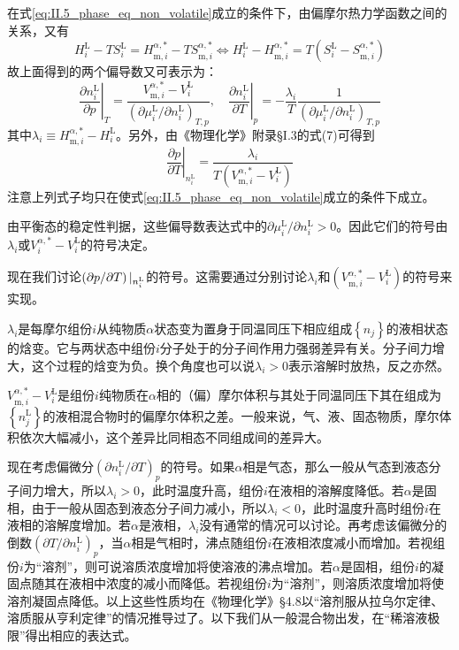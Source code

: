 \documentclass[main.tex]{subfiles}
\begin{document}
在式\eqref{eq:II.5_phase_eq_non_volatile}成立的条件下，由偏摩尔热力学函数之间的关系，又有
\[H_i^\text{L}-TS_i^\text{L}=H_{\text{m},i}^{\alpha,*}-TS_{\text{m},i}^{\alpha,*}\Leftrightarrow H_i^\text{L}-H_{\text{m},i}^{\alpha,*}=T\left(S_i^\text{L}-S_{\text{m},i}^{\alpha,*}\right)\]
故上面得到的两个偏导数又可表示为：
\[\left.\frac{\partial n_i^\text{L}}{\partial p}\right|_{T}=\frac{V_{\text{m},i}^{\alpha,*}-V_i^\text{L}}{\left(\partial \mu_i^\text{L}/\partial n_i^\text{L}\right)_{T,p}},\quad\left.\frac{\partial n_i^\text{L}}{\partial T}\right|_{p}=-\frac{\lambda_i}{T}\frac{1}{\left(\partial\mu_i^\text{L}/\partial n_i^\text{L}\right)_{T,p}}\]
其中$\lambda_i\equiv H_{\text{m},i}^{\alpha,*}-H_i^\text{L}$。另外，由《物理化学》附录\S I.3的式(7)可得到
\[\left.\frac{\partial p}{\partial T}\right|_{n_i^\text{L}}=\frac{\lambda_i}{T\left(V_{\text{m},i}^{\alpha,*}-V_i^\text{L}\right)}\]
注意上列式子均只在使式\eqref{eq:II.5_phase_eq_non_volatile}成立的条件下成立。

由平衡态的稳定性判据，这些偏导数表达式中的$\partial\mu_i^\text{L}/\partial n_i^\text{L}>0$。因此它们的符号由$\lambda_i$或$V_i^{\alpha,*}-V_i^\text{L}$的符号决定。

现在我们讨论$\left(\partial p\middle /\partial T\right)|_{n_i^\text{L}}$的符号。这需要通过分别讨论$\lambda_i$和$\left(V_{\text{m},i}^{\alpha,*}-V_i^\text{L}\right)$的符号来实现。

$\lambda_i$是每摩尔组份$i$从纯物质$\alpha$状态变为置身于同温同压下相应组成$\left\{n_j\right\}$的液相状态的焓变。它与两状态中组份$i$分子处于的分子间作用力强弱差异有关。分子间力增大，这个过程的焓变为负。换个角度也可以说$\lambda_i>0$表示溶解时放热，反之亦然。

$V_{\text{m},i}^{\alpha,*}-V_i^\text{L}$是组份$i$纯物质在$\alpha$相的（偏）摩尔体积与其处于同温同压下其在组成为$\left\{n_j^\text{L}\right\}$的液相混合物时的偏摩尔体积之差。一般来说，气、液、固态物质，摩尔体积依次大幅减小，这个差异比同相态不同组成间的差异大。

现在考虑偏微分$\left(\partial n_i^\text{L}/\partial T\right)_{p}$的符号。如果$\alpha$相是气态，那么一般从气态到液态分子间力增大，所以$\lambda_i>0$，此时温度升高，组份$i$在液相的溶解度降低。若$\alpha$是固相，由于一般从固态到液态分子间力减小，所以$\lambda_i<0$，此时温度升高时组份$i$在液相的溶解度增加。若$\alpha$是液相，$\lambda_i$没有通常的情况可以讨论。再考虑该偏微分的倒数$\left(\partial T/\partial n_i^\text{L}\right)_p$，当$\alpha$相是气相时，沸点随组份$i$在液相浓度减小而增加。若视组份$i$为“溶剂”，则可说溶质浓度增加将使溶液的沸点增加。若$\alpha$是固相，组份$i$的凝固点随其在液相中浓度的减小而降低。若视组份$i$为“溶剂”，则溶质浓度增加将使溶剂凝固点降低。以上这些性质均在《物理化学》\S4.8以“溶剂服从拉乌尔定律、溶质服从亨利定律”的情况推导过了。以下我们从一般混合物出发，在“稀溶液极限”得出相应的表达式。
\end{document}
